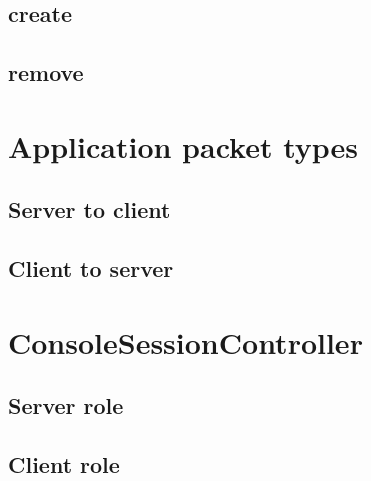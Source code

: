\documentclass{report}
\begin{document}
            \subsection{create}

            \subsection{remove}

        \section{Application packet types}
            \subsection{Server to client}

            \subsection{Client to server}

        \section{ConsoleSessionController}
            \subsection{Server role}

            \subsection{Client role}
        
    \newpage
\end{document}

